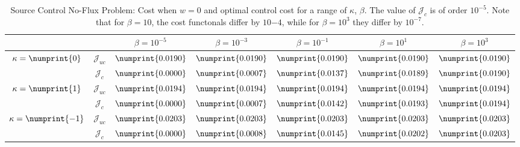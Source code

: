 \begin{table}
\centering
\begin{tabular}{ | c | c || c | c | c | c | c ||}
\hline
\multicolumn{2}{|c||}{}& $\beta = 10^{-5}$ & $\beta = 10^{-3}$ & $\beta = 10^{-1}$ & $\beta = 10^{1}$ & $\beta = 10^{3}$  \\
\hline
\hline
\multirow{2}{*}{$\kappa= \numprint{0}$}  & $\mathcal{J}_{uc}$ & $\numprint{0.0190}$ & $\numprint{0.0190}$ & $\numprint{0.0190}$ & $\numprint{0.0190}$ & $\numprint{0.0190}$\\
 & $\mathcal{J}_c$ & $\numprint{0.0000}$ & $\numprint{0.0007}$ & $\numprint{0.0137}$ & $\numprint{0.0189}$ & $\numprint{0.0190}$\\
\hline
\multirow{2}{*}{$\kappa= \numprint{1}$}  & $\mathcal{J}_{uc}$ & $\numprint{0.0194}$ & $\numprint{0.0194}$ & $\numprint{0.0194}$ & $\numprint{0.0194}$ & $\numprint{0.0194}$\\
 & $\mathcal{J}_c$ & $\numprint{0.0000}$ & $\numprint{0.0007}$ & $\numprint{0.0142}$ & $\numprint{0.0193}$ & $\numprint{0.0194}$\\
\hline
\multirow{2}{*}{$\kappa= \numprint{-1}$}  & $\mathcal{J}_{uc}$ & $\numprint{0.0203}$ & $\numprint{0.0203}$ & $\numprint{0.0203}$ & $\numprint{0.0203}$ & $\numprint{0.0203}$\\
 & $\mathcal{J}_c$ & $\numprint{0.0000}$ & $\numprint{0.0008}$ & $\numprint{0.0145}$ & $\numprint{0.0202}$ & $\numprint{0.0203}$\\
\hline
\end{tabular}
\caption{Source Control No-Flux Problem: Cost when $w=0$ and optimal control cost for a range of $\kappa$, $\beta$. The value of $\mathcal J_{c}$ is of order $10^{-5}$. Note that for $\beta = 10$, the cost functonals differ by $10{-4}$, while for $\beta = 10^3$ they differ by $10^{-7}$.}
\label{TabSCN}
\end{table}